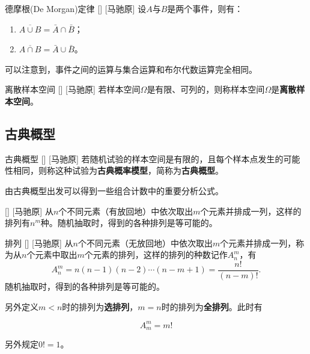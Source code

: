 \documentclass[UTF8]{ctexart}
\begin{document}
        \begin{thm}
            []
            {德摩根(De Morgan)定律}
            []
            [马驰原]
            设$A$与$B$是两个事件，则有：

            \begin{enumerate}
                \item $\overline{A\cup B}=\bar{A}\cap\bar{B}$；
                \item $\overline{A\cap B}=\bar{A}\cup\bar{B}$。
            \end{enumerate}
        \end{thm}

        可以注意到，事件之间的运算与集合运算和布尔代数运算完全相同。

        \begin{dfn}
            []
            {离散样本空间}
            []
            [马驰原]
            若样本空间$\Omega$是有限、可列的，则称样本空间$\Omega$是\textbf{离散样本空间}。
        \end{dfn}
    
    \subsection{古典概型}
    
        \begin{dfn}
            []
            {古典概型}
            []
            [马驰原]
            若随机试验的样本空间是有限的，且每个样本点发生的可能性相同，则称这种试验为\textbf{古典概率模型}，简称为\textbf{古典概型}。
        \end{dfn}

        由古典概型出发可以得到一些组合计数中的重要分析公式。

        \begin{xmp}
            []
            {}
            []
            [马驰原]
            从$n$个不同元素（有放回地）中依次取出$m$个元素并排成一列，这样的排列有$n^m$种。随机抽取时，得到的各种排列是等可能的。
        \end{xmp}

        \begin{xmp}
            []
            {排列}
            []
            [马驰原]
            从$n$个不同元素（无放回地）中依次取出$m$个元素并排成一列，称为从$n$个元素中取出$m$个元素的排列，这样的排列的种数记作$A_n^m$，有\[A_n^m=n(n-1)(n-2)\cdots(n-m+1)=\frac{n!}{(n-m)!}.\]随机抽取时，得到的各种排列是等可能的。

            另外定义$m<n$时的排列为\textbf{选排列}，$m=n$时的排列为\textbf{全排列}。此时有

            \[A^{m}_{m}=m!\]

            另外规定$0!=1$。
        \end{xmp}
\end{document}
